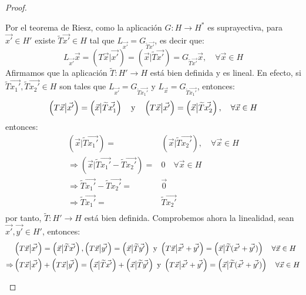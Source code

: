 \documentclass[12pt]{report}
\newcounter{it}
\theoremstyle{largebreak}
\newcommand\cf[3]{\ensuremath{#1:#2\rightarrow#3}}
\newcommand\adj[1]{\ensuremath{\widetilde{#1}}}
\newcommand\pint[2]{\ensuremath{\left(#1\big|#2\right)}}
\begin{document}
\begin{proof}
\begin{itemize}
            Por el teorema de Riesz, como la aplicación $\cf{G}{H}{H^*}$ es suprayectiva, para $\vec{x'}\in H'$ existe $\adj{T}\vec{x'}\in H$ tal que $L_{\vec{x'}}=G_{\adj{T}\vec{x'}}$, es decir que:
            \begin{equation*}
                L_{\vec{x'}}\vec{x}=\pint{T\vec{x}}{\vec{x'}}=\pint{\vec{x}}{\adj{T}\vec{x'}}=G_{\adj{T}\vec{x'}}\vec{x},\quad\forall\vec{x}\in H
            \end{equation*}
            Afirmamos que la aplicación $\cf{\adj{T}}{H'}{H}$ está bien definida y es lineal. En efecto, si $\adj{T}\vec{x_1'},\adj{T}\vec{x_2'}\in H$ son tales que $L_{\vec{x'}}=G_{\adj{T}\vec{x_1'}}$ y $L_{\vec{x}}=G_{\adj{T}\vec{x_1'}}$, entonces:
            \begin{equation*}
                \pint{T\vec{x}}{\vec{x'}}=\pint{\vec{x}}{\adj{T}\vec{x_1'}}\quad\textup{y}\quad\pint{T\vec{x}}{\vec{x'}}=\pint{\vec{x}}{\adj{T}\vec{x_2'}},\quad\forall\vec{x}\in H
            \end{equation*}
            entonces:
            \begin{equation*}
                \begin{split}
                    \pint{\vec{x}}{\adj{T}\vec{x_1'}}=&\pint{\vec{x}}{\adj{T}\vec{x_2'}},\quad\forall\vec{x}\in H\\
                    \Rightarrow \pint{\vec{x}}{\adj{T}\vec{x_1'}-\adj{T}\vec{x_2'}}=&0\quad\forall\vec{x}\in H\\
                    \Rightarrow\adj{T}\vec{x_1'}-\adj{T}\vec{x_2'}=&\vec{0}\\
                    \Rightarrow\adj{T}\vec{x_1'}=&\adj{T}\vec{x_2'}\\ 
                \end{split}
            \end{equation*}
            por tanto, $\cf{\adj{T}}{H'}{H}$ está bien definida. Comprobemos ahora la linealidad, sean $\vec{x'},\vec{y'}\in H'$, entonces:
            \begin{equation*}
                \begin{split}
                    &\pint{T\vec{x}}{\vec{x'}}=\pint{\vec{x}}{\adj{T}\vec{x'}},\pint{T\vec{x}}{\vec{y'}}=\pint{\vec{x}}{\adj{T}\vec{y'}}\textup{ y }\pint{T\vec{x}}{\vec{x'}+\vec{y'}}=\pint{\vec{x}}{\adj{T}(\vec{x'}+\vec{y'})}\quad\forall\vec{x}\in H\\
                    \Rightarrow& \pint{T\vec{x}}{\vec{x'}}+\pint{T\vec{x}}{\vec{y'}}=\pint{\vec{x}}{\adj{T}\vec{x'}}+\pint{\vec{x}}{\adj{T}\vec{y'}}\textup{ y }\pint{T\vec{x}}{\vec{x'}+\vec{y'}}=\pint{\vec{x}}{\adj{T}(\vec{x'}+\vec{y'})}\quad\forall\vec{x}\in H\\

\end{split}
\end{equation*}
\end{itemize}
\end{proof}
\end{document}
